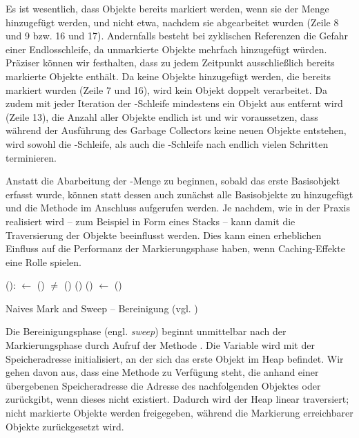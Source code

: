 
Es ist wesentlich, dass Objekte bereits markiert werden, wenn sie der Menge  hinzugefügt werden, und nicht etwa, nachdem sie abgearbeitet wurden (Zeile 8 und 9 bzw. 16 und 17).
Andernfalls besteht bei zyklischen Referenzen die Gefahr einer Endlosschleife, da unmarkierte Objekte mehrfach hinzugefügt würden.
Präziser können wir festhalten, dass  zu jedem Zeitpunkt ausschließlich bereits markierte Objekte enthält.
Da keine Objekte hinzugefügt werden, die bereits markiert wurden (Zeile 7 und 16), wird kein Objekt doppelt verarbeitet.
Da zudem mit jeder Iteration der \WHILE-Schleife mindestens ein Objekt aus  entfernt wird (Zeile 13), die Anzahl aller Objekte endlich ist und wir voraussetzen, dass während der Ausführung des Garbage Collectors keine neuen Objekte entstehen, wird sowohl die \WHILE-Schleife, als auch die \FOREACH-Schleife nach endlich vielen Schritten terminieren.

Anstatt die Abarbeitung der -Menge zu beginnen, sobald das erste Basisobjekt erfasst wurde, können statt dessen auch zunächst alle Basisobjekte zu  hinzugefügt und die Methode  im Anschluss aufgerufen werden.
Je nachdem, wie  in der Praxis realisiert wird -- zum Beispiel in Form eines Stacks -- kann damit die Traversierung der Objekte beeinflusst werden.
Dies kann einen erheblichen Einfluss auf die Performanz der Markierungsphase haben, wenn Caching-Effekte eine Rolle spielen. 

\begin{algorithm}
\begin{algorithmic}[1]
	\State {}():
	\State \quad {} $\gets$ ()
	\State \quad \WHILE {} $\neq$ \Null
	\State \quad \quad \IF {}()
	\State \quad \quad \quad {}()
	\State \quad \quad \ELSE {}()
	\State \quad \quad {} $\gets$ ()
\end{algorithmic}
\caption[Naives Mark and Sweep -- Bereinigung]{Naives Mark and Sweep -- Bereinigung (vgl. \cite[Kap. 2.2]{jones-lins})}
\label{algo:naive-sweep}
\end{algorithm}

Die Bereinigungsphase (engl. \textit{sweep}) beginnt unmittelbar nach der Markierungsphase durch Aufruf der Methode .
Die Variable  wird mit der Speicheradresse initialisiert, an der sich das erste Objekt im Heap befindet.
Wir gehen davon aus, dass eine Methode  zu Verfügung steht, die anhand einer übergebenen Speicheradresse die Adresse des nachfolgenden Objektes oder \Null zurückgibt, wenn dieses nicht existiert.
Dadurch wird der Heap linear traversiert; nicht markierte Objekte werden freigegeben, während die Markierung erreichbarer Objekte zurückgesetzt wird.

